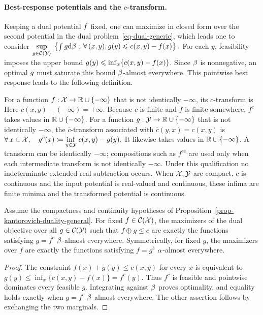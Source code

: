 \paragraph{\texorpdfstring{Best-response potentials and the $c$-transform.}{Best-response potentials and the c-transform.}}
Keeping a dual potential $f$ fixed, one can maximize in closed form over the second potential in the dual problem~\eqref{eq-dual-generic}, which leads one to consider
\(\underset{g \in \mathcal{C}(\mathcal{Y})}{\sup}\; \left\{  \int g \mathrm{d} \beta  \;;\;  \forall \, (x,y), g(y) \leqslant c(x,y) - f(x)  \right\}.\)
For each \(y\), feasibility imposes the upper bound
\(g(y)\leqslant\inf_x\{c(x,y)-f(x)\}\). Since \(\beta\) is nonnegative, an optimal \(g\) must saturate this bound \(\beta\)-almost everywhere. This pointwise best response leads to the following definition.
\begin{defn}[$c$-transform]\label{def-c-transform}
For a function $f:\mathcal{X}\to\mathbb{R}\cup\{-\infty\}$ that is not identically $-\infty$, its $c$-transform is
Here $c(x,y)-(-\infty)=+\infty$. Because $c$ is finite and $f$ is finite somewhere, $f^c$ takes values in $\mathbb{R}\cup\{-\infty\}$. For a function $g:\mathcal{Y}\to\mathbb{R}\cup\{-\infty\}$ that is not identically $-\infty$, the $\bar c$-transform associated with $\bar c(y,x)=c(x,y)$ is
\(\forall \, x \in \mathcal{X}, \quad g^{\bar{c}}(x) \coloneqq \underset{y \in \mathcal{Y}}{\inf}\; c(x,y) - g(y).\)
It likewise takes values in $\mathbb{R}\cup\{-\infty\}$. A transform can be identically $-\infty$; compositions such as $f^{c\bar c}$ are used only when each intermediate transform is not identically $-\infty$. Under this qualification no indeterminate extended-real subtraction occurs. When $\mathcal{X},\mathcal{Y}$ are compact, $c$ is continuous and the input potential is real-valued and continuous, these infima are finite minima and the transformed potential is continuous.
\end{defn}
\begin{prop}\label{prop-c-transform-semi-relaxed}
Assume the compactness and continuity hypotheses of Proposition~\ref{prop-kantorovich-duality-general}. For fixed $f\in\mathcal{C}(\mathcal{X})$, the maximizers of the dual objective over all $g\in\mathcal{C}(\mathcal{Y})$ such that $f\oplus g\leq c$ are exactly the functions satisfying $g=f^c$ $\beta$-almost everywhere. Symmetrically, for fixed $g$, the maximizers over $f$ are exactly the functions satisfying $f=g^{\bar c}$ $\alpha$-almost everywhere.
\end{prop}
\begin{proof}
The constraint $f(x)+g(y)\leq c(x,y)$ for every $x$ is equivalent to
\(g(y)\leq\inf_x\{c(x,y)-f(x)\}=f^c(y)\).
Thus $f^c$ is feasible and pointwise dominates every feasible $g$. Integrating against $\beta$ proves optimality, and equality holds exactly when $g=f^c$ $\beta$-almost everywhere. The other assertion follows by exchanging the two marginals.
\end{proof}
